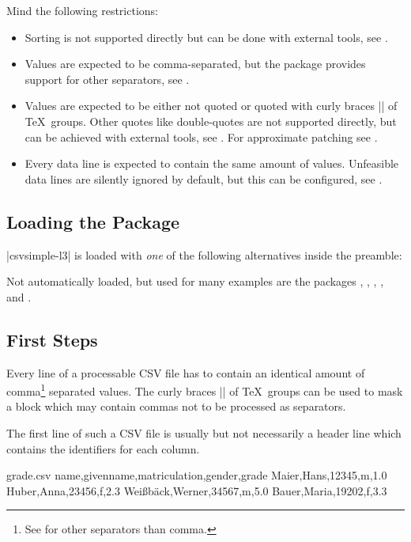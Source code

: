 \documentclass[a4paper,11pt]{ltxdoc}
\begin{document}
Mind the following restrictions:
\begin{itemize}
\item Sorting is not supported directly but can be done
  with external tools, see .
\item Values are expected to be comma-separated, but the package
  provides support for other separators, see .
\item Values are expected to be either not quoted or quoted with
  curly braces |{}| of \TeX\ groups. Other quotes like double-quotes
  are not supported directly, but can be achieved
  with external tools, see .
  For approximate patching see .
\item Every data line is expected to contain the same amount of values.
  Unfeasible data lines are silently ignored by default, but this can
  be configured, see .
\end{itemize}


\subsection{Loading the Package}
|csvsimple-l3| is loaded with \emph{one} of the following
alternatives inside the preamble:
\begin{dispListing}
\usepackage[l3]{csvsimple}
\usepackage{csvsimple-l3}
\end{dispListing}

Not automatically loaded, but used for many examples are the packages
, , , , and .


\clearpage
\subsection{First Steps}
Every line of a processable CSV file has to contain an identical amount of
comma\footnote{See  for other separators than comma.} separated values. The curly braces |{}| of \TeX\ groups can be used
to mask a block which may contain commas not to be processed as separators.

The first line of such a CSV file is usually but not necessarily a header line
which contains the identifiers for each column.

\begin{tcbverbatimwrite}{grade.csv}
name,givenname,matriculation,gender,grade
Maier,Hans,12345,m,1.0
Huber,Anna,23456,f,2.3
Weißbäck,Werner,34567,m,5.0
Bauer,Maria,19202,f,3.3
\end{tcbverbatimwrite}
\end{document}
